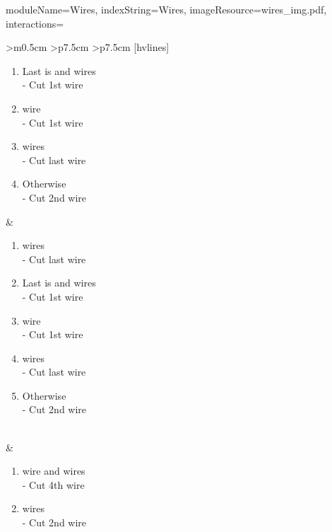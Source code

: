 \documentclass{../../ktane-mod}
\begin{document}
\begin{module}{
  moduleName=Wires,
  indexString=Wires,
  imageResource=wires_img.pdf,
  interactions=\keysymbol
}
\begin{NiceTabular}{
    >{\centering\arraybackslash}m{0.5cm}
    >{\centering\arraybackslash}p{7.5cm}
    >{\centering\arraybackslash}p{7.5cm}
  }[hvlines]
\begin{minipage}[c][5.1cm][t]{\linewidth}
\begin{enumerate}[label=\alph*.,itemsep=0pt]
                                  \item Last is \YELLOW and \RED[no RED] wires\\ - Cut 1st wire
                                  \item \BLUE[1 BLUE] wire\\ - Cut 1st wire
                                  \item \YELLOW[1+ YELLOW] wires\\ - Cut last wire
                                  \item Otherwise\\ - Cut 2nd wire
                                \end{enumerate}
    \end{minipage} & \begin{minipage}[c][5.1cm][t]{\linewidth}
                                                     \vspace*{0.1cm}
                       \begin{enumerate}[label=\alph*.,itemsep=0pt]
                         \item \RED[2+ RED] wires\\ - Cut last \RED wire
                         \item Last is \YELLOW and \RED[no RED] wires\\ - Cut 1st wire
                         \item \BLUE[1 BLUE] wire\\ - Cut 1st wire
                         \item \YELLOW[1+ YELLOW] wires\\ - Cut last wire
                         \item Otherwise\\ - Cut 2nd wire
                       \end{enumerate}
    \end{minipage} \\
     & \begin{minipage}[c][4cm][t]{\linewidth}
                                \vspace*{0.1cm}
                                \begin{enumerate}[label=\alph*.,itemsep=0pt]
                                  \item \RED[1 RED] wire and \YELLOW[2+ YELLOW] wires\\ - Cut 4th wire
                                  \item \BLACK[No BLACK] wires\\ - Cut 2nd wire

\end{enumerate}
\end{minipage}
\end{NiceTabular}
\end{module}
\end{document}
